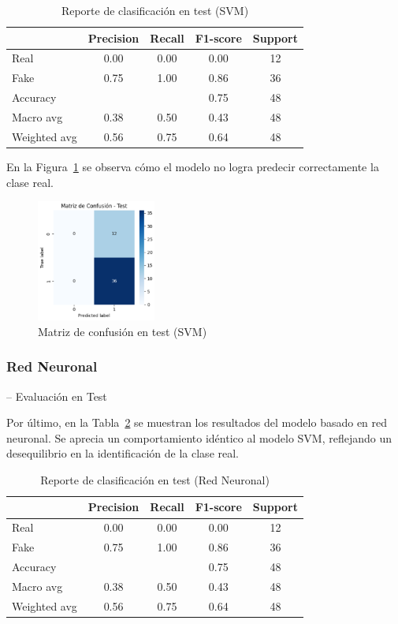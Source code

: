 \documentclass[conference]{IEEEtran}
\begin{document}
\begin{table}[htbp]
\centering
\caption{Reporte de clasificación en test (SVM)}
\begin{tabular}{lcccc}
\toprule
 & Precision & Recall & F1-score & Support \\
\midrule
Real & 0.00 & 0.00 & 0.00 & 12 \\
Fake & 0.75 & 1.00 & 0.86 & 36 \\
\midrule
Accuracy & & & 0.75 & 48 \\
Macro avg & 0.38 & 0.50 & 0.43 & 48 \\
Weighted avg & 0.56 & 0.75 & 0.64 & 48 \\
\bottomrule
\end{tabular}
\label{tab:svm_test}
\end{table}

\vspace{0.2cm}
En la Figura~\ref{fig:cm_svm} se observa cómo el modelo no logra predecir correctamente la clase real.
\begin{figure}[htbp]
\centering
\includegraphics[width=0.35\textwidth]{images/cm_svm.png}
\caption{Matriz de confusión en test (SVM)}
\label{fig:cm_svm}
\end{figure}


\subsubsection{Red Neuronal }-- Evaluación en Test

Por último, en la Tabla~\ref{tab:nn_test} se muestran los resultados del modelo basado en red neuronal. Se aprecia un comportamiento idéntico al modelo SVM, reflejando un desequilibrio en la identificación de la clase real.

\begin{table}[htbp]
\centering
\caption{Reporte de clasificación en test (Red Neuronal)}
\begin{tabular}{lcccc}
\toprule
 & Precision & Recall & F1-score & Support \\
\midrule
Real & 0.00 & 0.00 & 0.00 & 12 \\
Fake & 0.75 & 1.00 & 0.86 & 36 \\
\midrule
Accuracy & & & 0.75 & 48 \\
Macro avg & 0.38 & 0.50 & 0.43 & 48 \\
Weighted avg & 0.56 & 0.75 & 0.64 & 48 \\
\bottomrule
\end{tabular}
\label{tab:nn_test}
\end{table}
\end{document}
